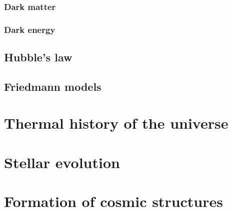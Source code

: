 \subsection{Dark matter}
\subsection{Dark energy}
\section{Hubble's law}
\section{Friedmann models}
\chapter{Thermal history of the universe}
\chapter{Stellar evolution}
\chapter{Formation of cosmic structures}



